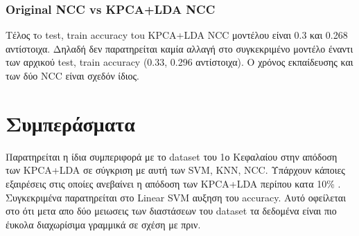 \subsubsection{Original NCC vs KPCA+LDA NCC}
Τέλος τo test, train accuracy tou KPCA+LDA NCC μοντέλου είναι 0.3 και 0.268 αντίστοιχα. Δηλαδή δεν παρατηρείται καμία αλλαγή στο συγκεκριμένο μοντέλο έναντι των αρχικού test, train accuracy (0.33, 0.296 αντίστοιχα). Ο χρόνος εκπαίδευσης και των δύο NCC είναι σχεδόν ίδιος.
\section{Συμπεράσματα}
Παρατηρείται η ίδια συμπεριφορά με το dataset του 1ο Κεφαλαίου  στην απόδοση των KPCA+LDA σε σύγκριση με αυτή των SVM, KNN, NCC. Υπάρχουν κάποιες εξαιρέσεις στις οποίες ανεβαίνει η απόδοση των KPCA+LDA περίπου κατα 10\% . Συγκεκριμένα παρατηρείται στο Linear SVM αυξηση του accuracy. Αυτό οφείλεται στο ότι μετα απο δύο μειωσεις των διαστάσεων του dataset τα δεδομένα είναι πιο έυκολα διαχωρίσιμα γραμμικά σε σχέση με πριν.